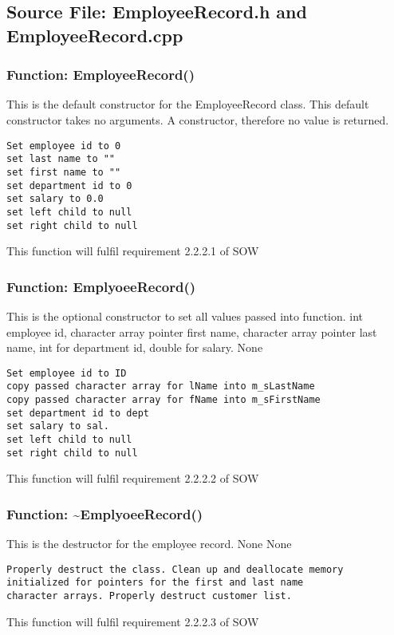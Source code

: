 \documentclass[12pt]{article}%
\newcounter{subsubsubsection}[subsubsection]
\begin{document}
\subsection{Source File: EmployeeRecord.h and EmployeeRecord.cpp}
\subsubsection{Function: EmployeeRecord()}
This is the default constructor for the EmployeeRecord class.
This default constructor takes no arguments.
A constructor, therefore no value is returned.
\begin{verbatim}
Set employee id to 0
set last name to ""
set first name to ""
set department id to 0
set salary to 0.0
set left child to null
set right child to null
\end{verbatim}
This function will fulfil requirement 2.2.2.1 of SOW

\subsubsection{Function: EmplyoeeRecord()}
This is the optional constructor to set all values passed into function.
int employee id, character array pointer first name, character array pointer last name, int for
department id, double for salary.
None
\begin{verbatim}
Set employee id to ID
copy passed character array for lName into m_sLastName
copy passed character array for fName into m_sFirstName
set department id to dept
set salary to sal.
set left child to null
set right child to null
\end{verbatim}
This function will fulfil requirement 2.2.2.2 of SOW

\subsubsection{Function: \textasciitilde EmplyoeeRecord()}
This is the destructor for the employee record.
None
None
\begin{verbatim}
Properly destruct the class. Clean up and deallocate memory initialized for pointers for the first and last name
character arrays. Properly destruct customer list.
\end{verbatim}
This function will fulfil requirement 2.2.2.3 of SOW
\end{document}
